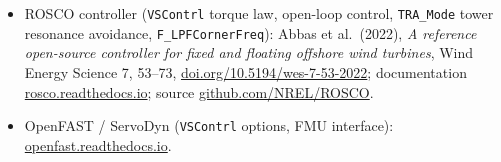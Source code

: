 \begin{itemize}
  \item ROSCO controller (\texttt{VSContrl} torque law, open-loop control,
        \texttt{TRA\_Mode} tower resonance avoidance, \texttt{F\_LPFCornerFreq}):
        Abbas et al.\ (2022), \emph{A reference open-source controller for fixed
        and floating offshore wind turbines}, Wind Energy Science 7, 53--73,
        \href{https://doi.org/10.5194/wes-7-53-2022}{doi.org/10.5194/wes-7-53-2022};
        documentation \href{https://rosco.readthedocs.io/}{rosco.readthedocs.io};
        source \href{https://github.com/NREL/ROSCO}{github.com/NREL/ROSCO}.
  \item OpenFAST / ServoDyn (\texttt{VSContrl} options, FMU interface):
        \href{https://openfast.readthedocs.io/}{openfast.readthedocs.io}.
\end{itemize}
